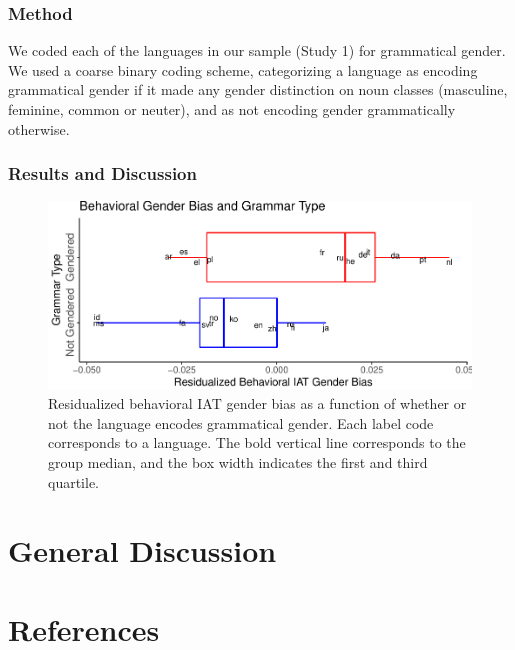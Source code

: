 \documentclass[man,floatsintext]{apa6}
\theoremstyle{definition}
\theoremstyle{definition}
\theoremstyle{definition}
\theoremstyle{remark}
\begin{document}
\subsubsection{Method}\label{method}

We coded each of the languages in our sample (Study 1) for grammatical
gender. We used a coarse binary coding scheme, categorizing a language
as encoding grammatical gender if it made any gender distinction on noun
classes (masculine, feminine, common or neuter), and as not encoding
gender grammatically otherwise.

\subsubsection{Results and Discussion}\label{results-and-discussion-1}

\begin{figure}
\centering
\includegraphics{iat_lang_files/figure-latex/unnamed-chunk-19-1.pdf}
\caption{\label{fig:unnamed-chunk-19}Residualized behavioral IAT gender bias
as a function of whether or not the language encodes grammatical gender.
Each label code corresponds to a language. The bold vertical line
corresponds to the group median, and the box width indicates the first
and third quartile.}
\end{figure}

\section{General Discussion}\label{general-discussion}

\newpage

\section{References}\label{references}

\begingroup
\setlength{\parindent}{-0.5in} \setlength{\leftskip}{0.5in}
\end{document}
